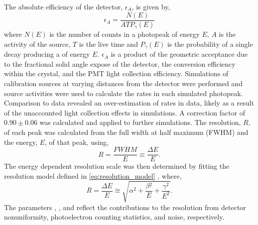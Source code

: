 The absolute efficiency of the detector, $\epsilon_{A}$, is given by,
%
\begin{equation}
    \epsilon_{A} = \frac{N(E)}{ATP_{\gamma}(E)}
    \label{eq:detector_eff}
\end{equation}
%
where $N(E)$ is the number of counts in a photopeak of energy $E$, $A$ is the activity of the source, $T$ is the live time and $P_{\gamma}(E)$ is the probability of a single decay producing a \gray{} of energy $E$. $\epsilon_{A}$ is a product of the geometric acceptance due to the fractional solid angle expose of the detector, the \gray{} conversion efficiency within the crystal, and the PMT light collection efficiency. Simulations of calibration sources at varying distances from the detector were performed and source activities were used to calculate the rates in each simulated photopeak. Comparison to data revealed an over-estimation of rates in data, likely as a result of the unaccounted light collection effects in simulations. A correction factor of $0.90 \pm 0.06$ was calculated and applied to further simulations. The resolution, $R$, of each peak was calculated from the full width at half maximum (FWHM) and the energy, $E$, of that peak, using,
%
\begin{equation}
    R = \frac{FWHM}{E} \equiv \frac{\Delta{}E}{E}.
    \label{eq:detector_eff}
\end{equation}
%
The energy dependent resolution scale was then determined by fitting the resolution model defined in \ref{eq:resolution_model} \cite{An:2016ses}, where, 
%
\begin{equation}
    R = \frac{\Delta{}E}{E} \cong \sqrt{\alpha{}^2 + \frac{\beta{}^2}{E} + \frac{\gamma{}^2}{E^{2}}}.
    \label{eq:resolution_model}
\end{equation}
%
The parameters \alpha, \beta, and \gamma reflect the contributions to the resolution from detector nonuniformity, photoelectron counting statistics, and noise, respectively.

